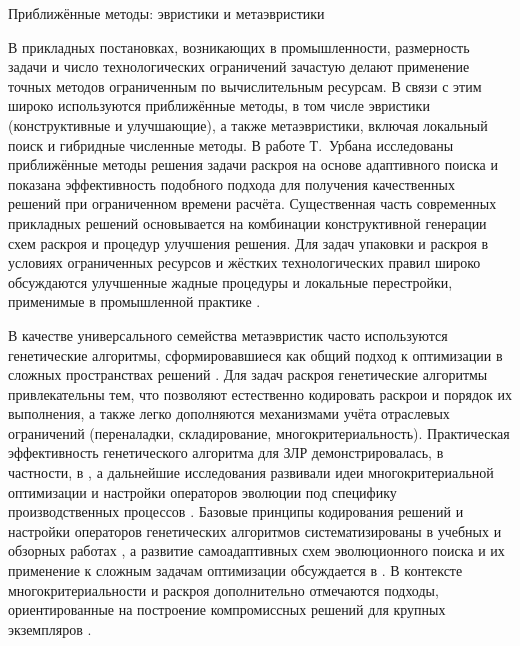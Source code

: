 {Приближённые методы: эвристики и метаэвристики}\label{subsec:theor_ch/heuristics}

В прикладных постановках, возникающих в промышленности, размерность задачи и число технологических ограничений зачастую делают применение точных методов ограниченным по вычислительным ресурсам.
В связи с этим широко используются приближённые методы, в том числе эвристики (конструктивные и улучшающие), а также метаэвристики, включая локальный поиск и гибридные численные методы.
В работе Т.~Урбана \cite{urban2015methods} исследованы приближённые методы решения задачи раскроя на основе адаптивного поиска и показана эффективность подобного подхода для получения качественных решений при ограниченном времени расчёта.
Существенная часть современных прикладных решений основывается на комбинации конструктивной генерации схем раскроя и процедур улучшения решения.
Для задач упаковки и раскроя в условиях ограниченных ресурсов и жёстких технологических правил широко обсуждаются улучшенные жадные процедуры и локальные перестройки, применимые в промышленной практике \cite{чеканин2012оптимизация,панюкова2012оптимизация}.

В качестве универсального семейства метаэвристик часто используются генетические алгоритмы, сформировавшиеся как общий подход к оптимизации в сложных пространствах решений \cite{goldberg1989genetic, holland1992_adaptation, goldberg1989_ga_search}.
Для задач раскроя генетические алгоритмы привлекательны тем, что позволяют естественно кодировать раскрои и порядок их выполнения, а также легко дополняются механизмами учёта отраслевых ограничений (переналадки, складирование, многокритериальность).
Практическая эффективность генетического алгоритма для ЗЛР демонстрировалась, в частности, в \cite{haessler1991}, а дальнейшие исследования развивали идеи многокритериальной оптимизации и настройки операторов эволюции под специфику производственных процессов \cite{araujo2014genetic,golfeto2009genetic,lai1997developing}.
Базовые принципы кодирования решений и настройки операторов генетических алгоритмов систематизированы в учебных и обзорных работах \cite{gladkov2010,kureichik1998, eiben2015_intro_ec, gendreau2019_handbook_metaheur}, а развитие самоадаптивных схем эволюционного поиска и их применение к сложным задачам оптимизации обсуждается в \cite{semenkina2013,diveev2017, deb2001_moo_ea}.
В контексте многокритериальности и раскроя дополнительно отмечаются подходы, ориентированные на построение компромиссных решений для крупных экземпляров \cite{архипов2015применение}.

